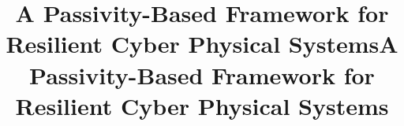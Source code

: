 



\ifx\techreport\undefined
\title{A Passivity-Based Framework for Resilient Cyber Physical Systems}
\else
\title{A Passivity-Based Framework for Resilient Cyber Physical Systems}
\fi
\author{}
\ifx\techreport\undefined
\else

\fi

\ifx\techreport\undefined
\maketitle
\fi








\appendices


